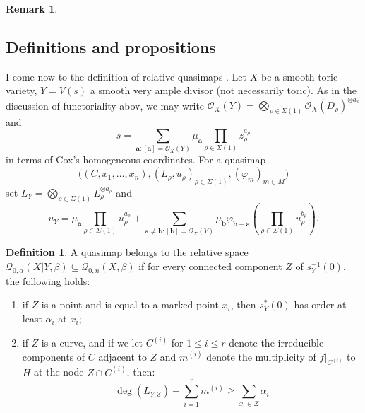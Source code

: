 \documentclass[11pt]{amsart}
\newcommand{\Q}[4]{\mathcal{Q}_{#1,#2}(#3,#4)}
\newcommand{\OO}{\mathcal{O}}
\theoremstyle{definition}
\theoremstyle{definition}
\newtheorem{definition}[thm]{Definition}
\newtheorem{rmk}[thm]{Remark}
\begin{document}
\begin{rmk}
\end{rmk}

\subsection{Definitions and propositions}
I come now to the definition of relative quasimaps \cite[\S 2.3]{BN}. Let $X$ be a smooth toric variety, $Y=V(s)$ a smooth very ample divisor (not necessarily toric). As in the discussion of functoriality abov, we may write $\OO_X(Y)=\bigotimes_{\rho\in\Sigma(1)}\OO_X(D_\rho)^{\otimes a_\rho}$ and 
\[s=\sum_{\mathbf a:[\mathbf a]=\OO_X(Y)}\mu_{\mathbf a}\prod_{\rho\in\Sigma(1)}z_\rho^{a_\rho}\]
in terms of Cox's homogeneous coordinates. For a quasimap 
\[ \Big((C,x_1,\ldots,x_n), (L_\rho,u_\rho)_{\rho \in \Sigma(1)}, (\varphi_m)_{m \in M}\Big) \]
set $L_Y=\bigotimes_{\rho\in\Sigma(1)}L_\rho^{\otimes a_\rho}$ and
\[u_Y=\mu_{\mathbf a}\prod_{\rho\in\Sigma(1)}u_\rho^{a_\rho}+\sum_{\mathbf a\neq \mathbf b:[\mathbf b]=\OO_X(Y)}\mu_{\mathbf b}\varphi_{\mathbf b-\mathbf a}\left(\prod_{\rho\in\Sigma(1)}u_\rho^{b_\rho}\right).\]
\begin{definition}
 A quasimap belongs to the relative space $\Q{0}{\alpha}{X|Y}{\beta}\subseteq \Q{0}{n}{X}{\beta}$ if for every connected component $Z$ of $s_Y^{-1}(0)$, the following holds:
\begin{enumerate}
\item if $Z$ is a point and is equal to a marked point $x_i$, then $s_Y^*(0)$ has order at least $\alpha_i$ at $x_i$;
\item if $Z$ is a curve, and if we let $C^{(i)}$ for $1 \leq i \leq r$ denote the irreducible components of $C$ adjacent to $Z$ and $m^{(i)}$ denote the multiplicity of $f|_{C^{(i)}}$ to $H$ at the node $Z \cap C^{(i)}$, then:
\begin{equation} \label{Relative quasimap internal component inequality} \deg(L_{Y|Z}) + \sum_{i=1}^r m^{(i)} \geq \sum_{x_i \in Z} \alpha_i \tag{\textasteriskcentered} \end{equation}
\end{enumerate}
\end{definition}



\end{document}
